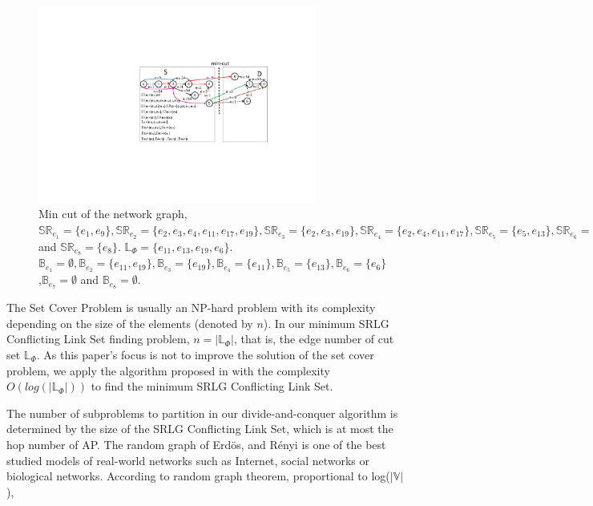 \begin{figure}[tp]
  \centering
  \includegraphics[width=3.6in]{franz/MinCutStarGraph}
  \caption{Min cut of the network graph, $\mathbb{SR}_{e_1}=\{e_1, e_9\},\mathbb{SR}_{e_2}=\{e_2,e_3,e_4, e_{11},e_{17},e_{19}\},\mathbb{SR}_{e_3}=\{e_2,e_3, e_{19}\},\mathbb{SR}_{e_4}=\{e_2,e_4, e_{11},e_{17}\},\mathbb{SR}_{e_5}=\{e_5, e_{13}\},\mathbb{SR}_{e_6}=\{e_6\},\mathbb{SR}_{e_7}=\{e_7\} $ and $\mathbb{SR}_{e_8}=\{e_8\}$. $\mathbb{L}_{\Phi}=\{e_{11},e_{13},e_{19},e_{6}\}$. $\mathbb{B}_{e_1}=\emptyset,\mathbb{B}_{e_2}=\{e_{11},e_{19}\},\mathbb{B}_{e_3}=\{e_{19}\},\mathbb{B}_{e_4}=\{e_{11}\},\mathbb{B}_{e_5}=\{e_{13}\},\mathbb{B}_{e_6}=\{e_6\}$,$\mathbb{B}_{e_7}=\emptyset$ and $\mathbb{B}_{e_8}=\emptyset$.}\label{fig:MinCutStarGraph}
  \label{fig:MinCutStarGraph}
\end{figure}

The Set Cover Problem is usually an NP-hard problem with its complexity depending on the size of the elements (denoted by $n$). In our minimum SRLG Conflicting Link Set finding problem, $n=|\mathbb{L}_{\Phi}|$, that is, the edge number of cut set $\mathbb{L}_{\Phi}$. As this paper's focus is not to improve the solution of the set cover problem, we apply the algorithm proposed in \cite{chvatal1979greedy} with the complexity $O(log(|\mathbb{L}_{\Phi}|))$  to find the minimum SRLG Conflicting Link Set.

The number of subproblems to partition in our divide-and-conquer algorithm is determined by the size of the SRLG Conflicting Link Set, which is at most  the hop number of  AP. The random graph of Erd{\"o}s, and R{\'e}nyi \cite{erdos1959random} is one of the best studied models of real-world networks such as Internet, social networks or biological networks. According to random graph theorem,  proportional to log($|\mathbb{\mathbb{V}}|$),  

